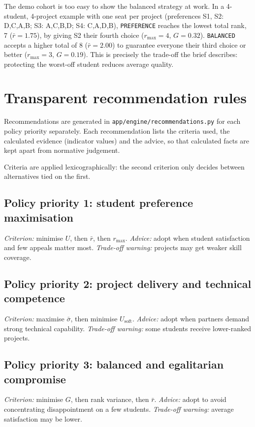 \documentclass[11pt,a4paper]{article}
\newcommand{\code}[1]{\texttt{#1}}
\begin{document}
The demo cohort is too easy to show the balanced strategy at work. In a
4-student, 4-project example with one seat per project (preferences
S1, S2: D,C,A,B; S3: A,C,B,D; S4: C,A,D,B), \code{PREFERENCE} reaches the
lowest total rank, 7 ($\bar r = 1.75$), by giving S2 their fourth choice
($r_{\max} = 4$, $G = 0.32$). \code{BALANCED} accepts a higher total of 8
($\bar r = 2.00$) to guarantee everyone their third choice or better
($r_{\max} = 3$, $G = 0.19$). This is precisely the trade-off the brief
describes: protecting the worst-off student reduces average quality.

\section{Transparent recommendation rules}

Recommendations are generated in \code{app/engine/recommendations.py} for each
policy priority separately. Each recommendation lists the criteria used, the
calculated evidence (indicator values) and the advice, so that calculated
facts are kept apart from normative judgement.

Criteria are applied lexicographically: the second criterion only decides
between alternatives tied on the first.

\subsection{Policy priority 1: student preference maximisation}
\emph{Criterion:} minimise $U$, then $\bar r$, then $r_{\max}$.
\emph{Advice:} adopt when student satisfaction and few appeals matter most.
\emph{Trade-off warning:} projects may get weaker skill coverage.

\subsection{Policy priority 2: project delivery and technical competence}
\emph{Criterion:} maximise $\bar\sigma$, then minimise $U_{\text{soft}}$.
\emph{Advice:} adopt when partners demand strong technical capability.
\emph{Trade-off warning:} some students receive lower-ranked projects.

\subsection{Policy priority 3: balanced and egalitarian compromise}
\emph{Criterion:} minimise $G$, then rank variance, then $\bar r$.
\emph{Advice:} adopt to avoid concentrating disappointment on a few students.
\emph{Trade-off warning:} average satisfaction may be lower.
\end{document}

